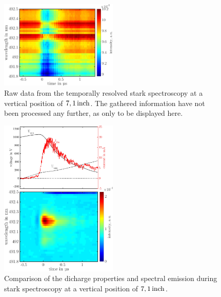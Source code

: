 \documentclass[a4paper,10pt,twoside]{article}
\begin{document}
				\begin{figure}[h]
					\centering
					\includegraphics[width=0.5\textwidth]{figures/stark/stark_71inraw.pdf}
					\caption{Raw data from the temporally resolved stark spectroscopy at a vertical position of $\unit[7,1]{inch}$. The gathered information have not been processed any further, as only to be displayed here.}
				\end{figure}

				\begin{figure}
					\centering
						\includegraphics[width=0.5\textwidth]{figures/stark/stark71combination.pdf}
					\caption{Comparison of the dicharge properties and spectral emission during stark spectroscopy at a vertical position of $\unit[7,1]{inch}$. }
					\label{img:stark71comparison}
				\end{figure}
\end{document}
